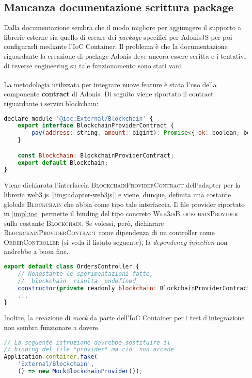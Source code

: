     \subsection{Mancanza documentazione scrittura package}
    \label{impl:ioc:no-docs}
    Dalla documentazione sembra che il modo migliore per aggiungere il supporto a librerie esterne sia quello di creare dei \textit{package} specifici per AdonisJS per poi configurarli mediante l'IoC Container. Il problema è che la documentazione riguardante la creazione di package Adonis deve ancora essere scritta e i tentativi di reverse engineering su tale funzionamento sono stati vani.
    \\\\
    La metodologia utilizzata per integrare nuove feature è stata l'uso della componente \textbf{contract} di Adonis. Di seguito viene riportato il contract riguardante i servizi blockchain:
    \begin{lstlisting}[language=JavaScript]
declare module '@ioc:External/Blockchain' {
    export interface BlockchainProviderContract {
        pay(address: string, amount: bigint): Promise<{ ok: boolean; body?: any }>;
    }

    const Blockchain: BlockchainProviderContract;
    export default Blockchain;
}
    \end{lstlisting}
    Viene dichiarata l'interfaccia \textsc{BlockchainProviderContract} dell'adapter per la libreria web3.js [\autoref{img:adapter-web3js}] e viene, dunque, definita una costante globale \textsc{Blockchain} che abbia come tipo tale interfaccia. Il file provider riportato in \autoref{impl:ioc} permette il binding del tipo concreto \textsc{Web3jsBlockchainProvider} sulla costante \textsc{Blockchain}. Se volessi, però, dichiarare \textsc{BlockchainProviderContract} come dipendenza di un controller come \textsc{OrderController} (si veda il listato seguente), la \textit{dependency injection} non andrebbe a buon fine.
    \begin{lstlisting}[language=JavaScript]
export default class OrdersController {
    // Nonostante le sperimentazioni fatte,
    // `blockchain` risulta _undefined_
    constructor(private readonly blockchain: BlockchainProviderContract) {}
    ...
}
    \end{lstlisting}

    \noindent Inoltre, la creazione di \textit{mock} da parte dell'IoC Container per i test d'integrazione non sembra funzionare a dovere.
    \begin{lstlisting}[language=JavaScript]
// La seguente istruzione dovrebbe sostituire il
// binding del file *provider* ma cio' non accade
Application.container.fake(
    'External/Blockchain',
    () => new MockBlockchainProvider());
    \end{lstlisting}

